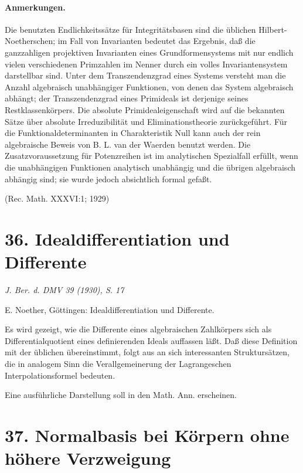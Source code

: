\documentclass[11pt]{article}
\begin{document}
\paragraph{Anmerkungen.}
Die benutzten Endlichkeitssätze für Integritätsbasen sind die üblichen Hilbert-Noetherschen; im Fall von Invarianten bedeutet das Ergebnis, daß die ganzzahligen projektiven Invarianten eines Grundformensystems mit nur endlich vielen verschiedenen Primzahlen im Nenner durch ein volles Invariantensystem darstellbar sind. Unter dem Transzendenzgrad eines Systems versteht man die Anzahl algebraisch unabhängiger Funktionen, von denen das System algebraisch abhängt; der Transzendenzgrad eines Primideals ist derjenige seines Restklassenkörpers. Die absolute Primidealeigenschaft wird auf die bekannten Sätze über absolute Irreduzibilität und Eliminationstheorie zurückgeführt. Für die Funktionaldeterminanten in Charakteristik Null kann auch der rein algebraische Beweis von B. L. van der Waerden benutzt werden. Die Zusatzvoraussetzung für Potenzreihen ist im analytischen Spezialfall erfüllt, wenn die unabhängigen Funktionen analytisch unabhängig und die übrigen algebraisch abhängig sind; sie wurde jedoch absichtlich formal gefaßt.

\begin{center}
(Rec. Math. XXXVI:1; 1929)
\end{center}

\section*{36. Idealdifferentiation und Differente}

\begin{center}
\emph{J. Ber. d. DMV 39 (1930), S. 17}
\end{center}

E. Noether, Göttingen: Idealdifferentiation und Differente.

Es wird gezeigt, wie die Differente eines algebraischen Zahlkörpers sich als Differentialquotient eines definierenden Ideals auffassen läßt. Daß diese Definition mit der üblichen übereinstimmt, folgt aus an sich interessanten Struktursätzen, die in analogem Sinn die Verallgemeinerung der Lagrangeschen Interpolationsformel bedeuten.

Eine ausführliche Darstellung soll in den Math. Ann. erscheinen.

\section*{37. Normalbasis bei Körpern ohne höhere Verzweigung}
\end{document}

